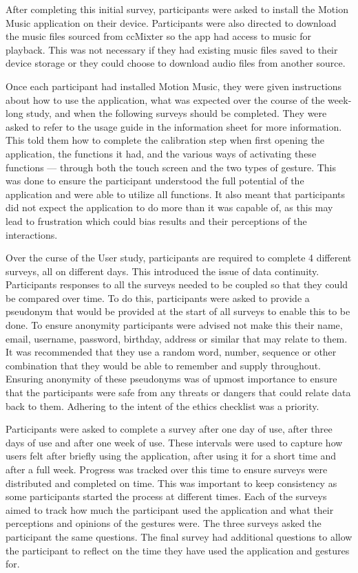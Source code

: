 \documentclass{l4proj}
\begin{document}
After completing this initial survey, participants were asked to install the Motion Music application on their device. Participants were also directed to download the music files sourced from ccMixter so the app had access to music for playback. This was not necessary if they had existing music files saved to their device storage or they could choose to download audio files from another source.

Once each participant had installed Motion Music, they were given instructions about how to use the application, what was expected over the course of the week-long study, and when the following surveys should be completed. They were asked to refer to the usage guide in the information sheet for more information. This told them how to complete the calibration step when first opening the application, the functions it had, and the various ways of activating these functions --- through both the touch screen and the two types of gesture. This was done to ensure the participant understood the full potential of the application and were able to utilize all functions. It also meant that participants did not expect the application to do more than it was capable of, as this may lead to frustration which could bias results and their perceptions of the interactions.

Over the curse of the User study, participants are required to complete 4 different surveys, all on different days. This introduced the issue of data continuity. Participants responses to all the surveys needed to be coupled so that they could be compared over time. To do this, participants were asked to provide a pseudonym that would be provided at the start of all surveys to enable this to be done. To ensure anonymity participants were advised not make this their name, email, username, password, birthday, address or similar that may relate to them. It was recommended that they use a random word, number, sequence or other combination that they would be able to remember and supply throughout. Ensuring anonymity of these pseudonyms was of upmost importance to ensure that the participants were safe from any threats or dangers that could relate data back to them. Adhering to the intent of the ethics checklist was a priority. 

Participants were asked to complete a survey after one day of use, after three days of use and after one week of use. These intervals were used to capture how users felt after briefly using the application, after using it for a short time and after a full week. Progress was tracked over this time to ensure surveys were distributed and completed on time. This was important to keep consistency as some participants started the process at different times. Each of the surveys aimed to track how much the participant used the application and what their perceptions and opinions of the gestures were. The three surveys asked the participant the same questions. The final survey had additional questions to allow the participant to reflect on the time they have used the application and gestures for.
\end{document}
